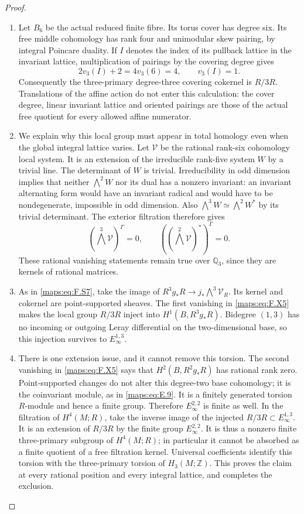 \begin{proof}
\begin{enumerate}[label=\arabic*.]
\item Let $B_6$ be the actual reduced finite fibre.  Its torus
cover has degree six.  Its free middle cohomology has
rank four and unimodular skew pairing, by integral
Poincare duality.  If $I$ denotes the index of its
pullback lattice in the invariant lattice, multiplication
of pairings by the covering degree gives
\[
 2v_3(I)+2=4v_3(6)=4,
 \qquad v_3(I)=1.
 \tag{F.X4}\label{maps:eq:F.X4}
\]
Consequently the three-primary degree-three covering
cokernel is $R/3R$.  Translations of the affine action
do not enter this calculation: the cover degree,
linear invariant lattice and oriented pairings are
those of the actual free quotient for every allowed
affine numerator.

\item We explain why this local group must appear in total
homology even when the global integral lattice varies.
Let $\mathcal V$ be the rational rank-six cohomology
local system.  It is an extension of the irreducible
rank-five system $W$ by a trivial line.  The determinant
of $W$ is trivial.  Irreducibility in odd dimension
implies that neither $\bigwedge^2 W$ nor its dual
has a nonzero invariant: an invariant alternating
form would have an invariant radical and would have
to be nondegenerate, impossible in odd dimension.
Also $\bigwedge^3W\simeq\bigwedge^2W^*$ by its
trivial determinant.  The exterior filtration therefore
gives
\[
 (\bigwedge^3\mathcal V)^\Gamma=0,\qquad
 ((\bigwedge^2\mathcal V)^*)^\Gamma=0.
 \tag{F.X5}\label{maps:eq:F.X5}
\]
These rational vanishing statements remain true over
$\mathbb Q_3$, since they are kernels of rational
matrices.

\item As in \eqref{maps:eq:F.S7}, take the image of
$R^3g_*R\to j_*\bigwedge^3\mathcal V_R$.
Its kernel and cokernel are point-supported sheaves.
The first vanishing in \eqref{maps:eq:F.X5} makes the local group
$R/3R$ inject into $H^1(B,R^3g_*R)$.  Bidegree $(1,3)$
has no incoming or outgoing Leray differential on
the two-dimensional base, so this injection survives
to $E_\infty^{1,3}$.

\item There is one extension issue, and it cannot remove
this torsion.  The second vanishing in \eqref{maps:eq:F.X5} says
that $H^2(B,R^2g_*R)$ has rational rank zero.
Point-supported changes do not alter this degree-two
base cohomology; it is the coinvariant module, as
in \eqref{maps:eq:E.9}.  It is a finitely generated torsion $R$-module
and hence a finite group.  Therefore
$E_\infty^{2,2}$ is finite as well.  In the filtration
of $H^4(M;R)$, take the inverse image of the injected
$R/3R\subset E_\infty^{1,3}$.  It is an extension
of $R/3R$ by the finite group $E_\infty^{2,2}$.
It is thus a nonzero finite three-primary subgroup
of $H^4(M;R)$; in particular it cannot be absorbed
as a finite quotient of a free filtration kernel.
Universal coefficients identify this torsion with
the three-primary torsion of $H_3(M;\mathbb Z)$.
This proves the claim at every rational position and
every integral lattice, and completes the exclusion.

\end{enumerate}
\end{proof}
